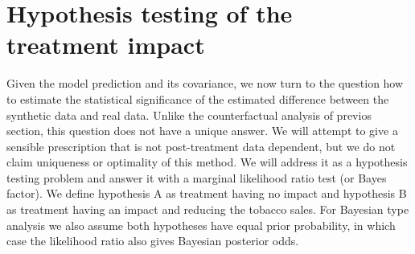 \documentclass{article}
\begin{document}
\section{Hypothesis testing of the treatment impact}
\label{sec:significance}

Given the model prediction and its covariance, we now turn to the question how to estimate the statistical significance of the estimated difference between the synthetic data and real data. Unlike the counterfactual analysis of previos section, 
this question does not have a unique answer. We will attempt to give a 
sensible prescription that is not post-treatment data dependent, but 
we do not claim uniqueness or optimality of this method. 
We will address it as a  
hypothesis testing problem and answer it with a marginal likelihood ratio test (or Bayes factor). We define hypothesis A as
treatment having no impact and hypothesis B as treatment 
having an impact and reducing the tobacco sales. For Bayesian type analysis we also assume both hypotheses have 
equal prior probability, in which case the likelihood ratio also gives Bayesian posterior odds. 
\end{document}
